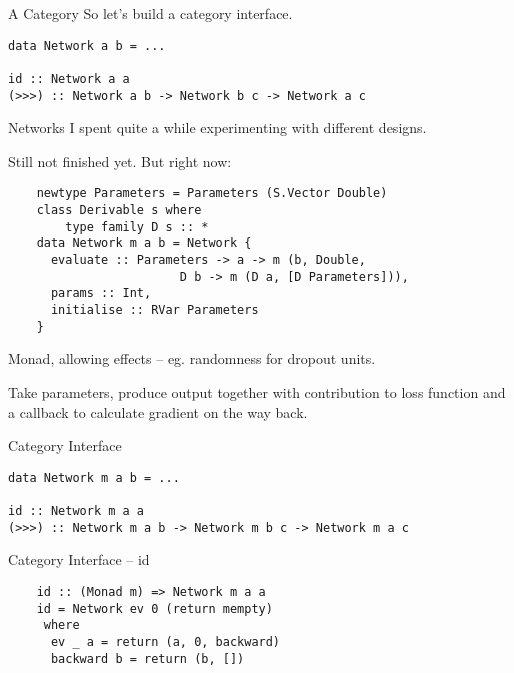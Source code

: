 \documentclass[10pt]{beamer}
\newenvironment{xframe}[1][]{\begin{frame}[fragile,environment=xframe,#1]}{\end{frame}}
\begin{document}
\begin{xframe}{A Category}
  So let's build a category interface.

  \begin{verbatim}
data Network a b = ...

id :: Network a a
(>>>) :: Network a b -> Network b c -> Network a c
  \end{verbatim}
\end{xframe}

\begin{xframe}{Networks}
  I spent quite a while experimenting with different designs.

  Still not finished yet. But right now:

  \begin{verbatim}
    newtype Parameters = Parameters (S.Vector Double)
    class Derivable s where
        type family D s :: *
    data Network m a b = Network {
      evaluate :: Parameters -> a -> m (b, Double,
                        D b -> m (D a, [D Parameters])),
      params :: Int,
      initialise :: RVar Parameters
    }
  \end{verbatim}

  Monad, allowing effects -- eg. randomness for dropout units.

  Take parameters, produce output together with contribution to loss function and a callback to calculate gradient on the way back.
\end{xframe}




\begin{xframe}{Category Interface}
  \begin{verbatim}
data Network m a b = ...

id :: Network m a a
(>>>) :: Network m a b -> Network m b c -> Network m a c
  \end{verbatim}
\end{xframe}

\begin{xframe}{Category Interface -- id}
  \begin{verbatim}
    id :: (Monad m) => Network m a a
    id = Network ev 0 (return mempty)
     where
      ev _ a = return (a, 0, backward)
      backward b = return (b, [])
  \end{verbatim}
\end{xframe}
\end{document}
